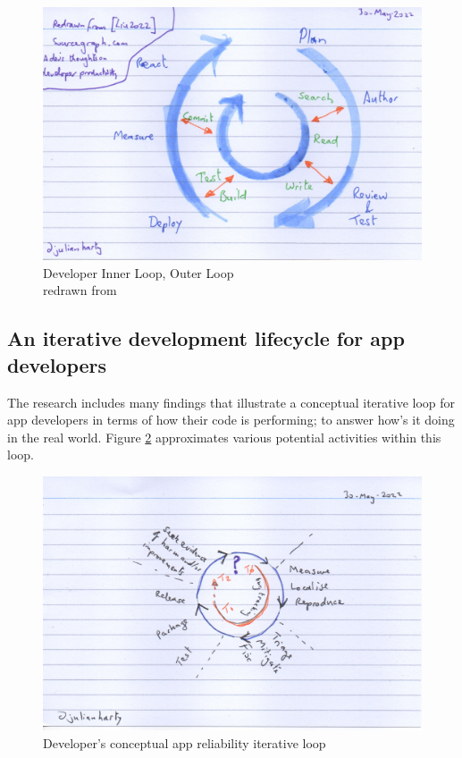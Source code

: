\begin{figure}
    \centering
    \includegraphics[width=12cm]{images/rough-sketches/developer-inner-loop-outer-loop.jpeg}
    \caption{Developer Inner Loop, Outer Loop\\ redrawn from \citep{liu2022_a_devs_thoughts_onDeveloper_productivity}}
    \label{fig:developer-inner-loop-outer-loop}
\end{figure}

\subsection{An iterative development lifecycle for app developers}
The research includes many findings that illustrate a conceptual iterative loop for app developers in terms of how their code is performing; to answer how's it doing in the real world. Figure \ref{fig:dev-app-reliability-iterative-loop} approximates various potential activities within this loop.

\begin{figure}
    \centering
    \includegraphics[width=12cm]{images/rough-sketches/dev-app-reliability-iterative-loop.jpeg}
    \caption{Developer's conceptual app reliability iterative loop}
    \label{fig:dev-app-reliability-iterative-loop}
\end{figure}

